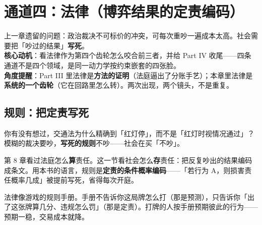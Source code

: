 \documentclass[../../main2.tex]{subfiles}
\begin{document}
\chapter{通道四：法律（博弈结果的定责编码）}
\label{ch:law}

\begin{motivation}
	上一章遗留的问题：政治裁决不可标价的冲突，可每次重吵一遍成本太高。社会需要把「吵过的结果」\textbf{写死}。\\
	\textbf{核心动机}：看法律作为第四个齿轮怎么咬合前三者，并给 Part IV 收尾——四条通道不是四个领域，是同一动力学按约束嵌套的四张脸。\\
	\textbf{角度提醒}：Part III 里法律是\textbf{方法的证明}（法庭逼出了分账手艺）；本章里法律是\textbf{系统的一个齿轮}（它在回路里怎么转）。两次出现，两个镜头，不是重复。
\end{motivation}

\begin{logicmap}
\end{logicmap}

\section{规则：把定责写死}

\begin{readingnote}
	你有没有想过，交通法为什么精确到「红灯停」，而不是「红灯时视情况通过」？\\
	模糊的裁决要吵，\textbf{写死的规则}不吵——社会在买「不吵」。
\end{readingnote}

第 8 章看过法庭怎么\textbf{算}责任。这一节看社会怎么\textbf{存}责任：把反复吵出的结果编码成条文。用本书的语言，规则是\textbf{定责的条件概率编码}——「若行为 A，则损害责任概率几成」被提前写死，省得每次开庭。

\begin{tcolorbox}[colback=green!5, title=\textit{生活类比}]
	法律像游戏的规则手册。手册不告诉你这局牌怎么打（那是预测），只告诉你「出了这张牌算几分、违规怎么罚」（那是定责）。打牌的人按手册预期彼此的行为——预期一稳，交易成本就降。
\end{tcolorbox}
\end{document}
